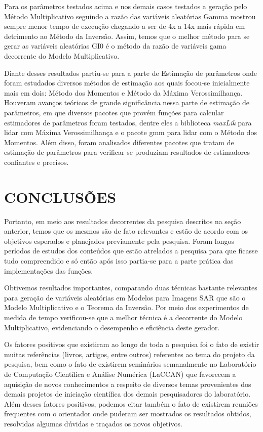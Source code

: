 \documentclass[12pt,letterpaper]{article}
\begin{document}
Para os parâmetros testados acima e nos demais casos testados a geração pelo Método Multiplicativo seguindo a razão das variáveis aleatórias Gamma mostrou sempre menor tempo de execução chegando a ser de 4x a 14x mais rápida em detrimento ao Método da Inversão. Assim, temos que o melhor método para se gerar as variáveis aleatórias GI0 é o método da razão de variáveis gama decorrente do Modelo Multiplicativo.

Diante desses resultados partiu-se para a parte de Estimação de parâmetros onde foram estudados diversos métodos de estimação aos quais focou-se inicialmente mais em dois: Método dos Momentos e Método da Máxima Verossimilhança. Houveram avanços teóricos de grande significância nessa parte de estimação de parâmetros, em que diversos pacotes que provém funções para calcular estimadores de parâmetros foram testados, dentre eles a biblioteca \textit{maxLik} para lidar com Máxima Verossimilhança e o pacote gmm para lidar com o Método dos Momentos. Além disso, foram analisados diferentes pacotes que tratam de estimação de parâmetros para verificar se produziam resultados de estimadores confiantes e precisos.   


\newpage
\section*{\centering \textbf{CONCLUSÕES}} %

Portanto, em meio aos resultados decorrentes da pesquisa descritos na seção anterior, temos que os mesmos são de fato relevantes e estão de acordo com os objetivos esperados e planejados previamente pela pesquisa. Foram longos períodos de estudos dos conteúdos que estão atrelados a pesquisa para que ficasse tudo compreendido e só então após isso partia-se para a parte prática das implementações das funções.

Obtivemos resultados importantes, comparando duas técnicas bastante relevantes para geração de variáveis aleatórias em Modelos para Imagens SAR que são o Modelo Multiplicativo e o Teorema da Inversão. Por meio dos experimentos de medida de tempo verificou-se que a melhor técnica é a decorrente do Modelo Multiplicativo, evidenciando o desempenho e eficiência deste gerador.

Os fatores positivos que existiram ao longo de toda a pesquisa foi o fato de existir muitas referências (livros, artigos, entre outros) referentes ao tema do projeto da pesquisa, bem como o fato de existirem seminários semanalmente no Laboratório de Computação Científica e Análise Numérica (LaCCAN) que favorecem a aquisição de novos conhecimentos a respeito de diversos temas provenientes dos demais projetos de
iniciação científica dos demais pesquisadores do laboratório. Além desses fatores positivos, podemos citar também o fato de existirem reuniões frequentes com o orientador onde puderam ser mostrados os resultados obtidos, resolvidas algumas dúvidas e traçados os novos objetivos.
\end{document}
